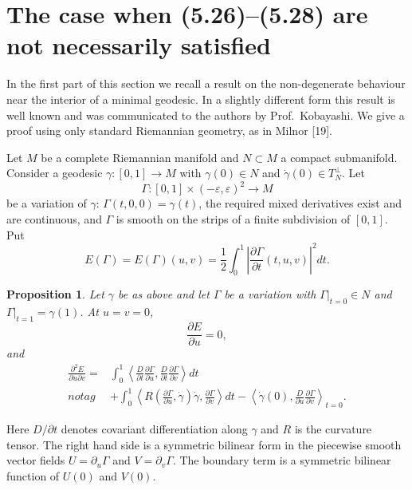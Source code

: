 \documentclass[11pt,a4paper]{article}
\newcommand{\eps}{\varepsilon}
\numberwithin{equation}{section}
\newtheorem{proposition}[theorem]{Proposition}
\theoremstyle{remark}
\begin{document}
\section{The case when (5.26)--(5.28) are not necessarily satisfied}
In the first part of this section we recall a result on the non-degenerate behaviour near the interior of a minimal geodesic. In a slightly different form this result is well known and was communicated to the authors by Prof.~Kobayashi. We give a proof using only standard Riemannian geometry, as in Milnor [19].

Let $M$ be a complete Riemannian manifold and $N\subset M$ a compact submanifold. Consider a geodesic $\gamma:[0,1]\to M$ with $\gamma(0)\in N$ and $\dot\gamma(0)\in T_N^\perp$. Let
\[
\Gamma:[0,1]\times(-\eps,\eps)^2\longrightarrow M
\]
be a variation of $\gamma$: $\Gamma(t,0,0)=\gamma(t)$, the required mixed derivatives exist and are continuous, and $\Gamma$ is smooth on the strips of a finite subdivision of $[0,1]$. Put
\begin{equation}
E(\Gamma)=E(\Gamma)(u,v)
=\frac12\int_0^1
\left|\frac{\partial\Gamma}{\partial t}(t,u,v)\right|^2dt.
\tag{6.1}
\end{equation}

\begin{proposition}
Let $\gamma$ be as above and let $\Gamma$ be a variation with $\Gamma|_{t=0}\in N$ and $\Gamma|_{t=1}=\gamma(1)$. At $u=v=0$,
\begin{equation}
\frac{\partial E}{\partial u}=0,
\tag{6.2}
\end{equation}
and
\begin{align}
\frac{\partial^2E}{\partial u\partial v}
={}&\int_0^1
\left\langle
\frac{D}{\partial t}\frac{\partial\Gamma}{\partial u},
\frac{D}{\partial t}\frac{\partial\Gamma}{\partial v}
\right\rangle dt \\notag
&+\int_0^1
\left\langle
R\left(\frac{\partial\Gamma}{\partial u},\dot\gamma\right)\dot\gamma,
\frac{\partial\Gamma}{\partial v}
\right\rangle dt
-\left\langle
\dot\gamma(0),
\frac{D}{\partial u}\frac{\partial\Gamma}{\partial v}
\right\rangle_{t=0}.
\tag{6.3}
\end{align}
\end{proposition}
Here $D/\partial t$ denotes covariant differentiation along $\gamma$ and $R$ is the curvature tensor. The right hand side is a symmetric bilinear form in the piecewise smooth vector fields
$U=\partial_u\Gamma$ and $V=\partial_v\Gamma$. The boundary term is a symmetric bilinear function of $U(0)$ and $V(0)$.
\end{document}
